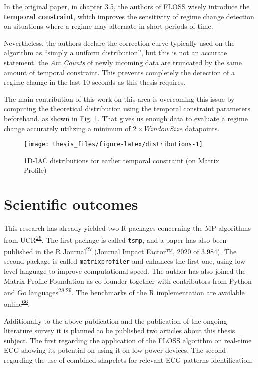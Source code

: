 \documentclass[12pt,twoside]{fmupthesis}
\begin{document}
In the original paper, in chapter 3.5, the authors of FLOSS wisely introduce the \textbf{temporal
constraint}, which improves the sensitivity of regime change detection on situations where
a regime may alternate in short periods of time.

Nevertheless, the authors declare the correction curve typically used on the algorithm as ``simply a
uniform distribution'', but this is not an accurate statement. the \emph{Arc Counts} of newly incoming
data are truncated by the same amount of temporal constraint. This prevents completely the detection
of a regime change in the last 10 seconds as this thesis requires.

The main contribution of this work on this area is overcoming this issue by computing the
theoretical distribution using the temporal constraint parameters beforehand. as shown in Fig.
\ref{fig:distributions}. That gives us enough data to evaluate a regime change accurately utilizing
a minimum of \(2 \times WindowSize\) datapoints.
\begin{figure}

{\centering \texttt{[image: thesis\_files/figure-latex/distributions-1]} 

}

\caption{1D-IAC distributions for earlier temporal constraint (on Matrix Profile)}\label{fig:distributions}
\end{figure}
\hypertarget{scientific-outcomes}{%
\chapter{Scientific outcomes}\label{scientific-outcomes}}

This research has already yielded two R packages concerning the MP algorithms from UCR\textsuperscript{\protect\hyperlink{ref-mpucr}{26}}. The
first package is called \texttt{tsmp}, and a paper has also been published in the R Journal\textsuperscript{\protect\hyperlink{ref-RJ-2020-021}{27}}
(Journal Impact Factor™, 2020 of 3.984). The second package is called \texttt{matrixprofiler} and enhances
the first one, using low-level language to improve computational speed. The author has also joined
the Matrix Profile Foundation as co-founder together with contributors from Python and Go languages\textsuperscript{\protect\hyperlink{ref-mpf2020}{28},\protect\hyperlink{ref-VanBenschoten2020}{29}}. The benchmarks of the R implementation are available online\textsuperscript{\protect\hyperlink{ref-Bischoff2021a}{66}}.

Additionally to the above publication and the publication of the ongoing literature survey it is planned
to be published two articles about this thesis subject. The first regarding the application of the
FLOSS algorithm on real-time ECG showing its potential on using it on low-power devices. The second
regarding the use of combined shapelets for relevant ECG patterns identification.
\end{document}
